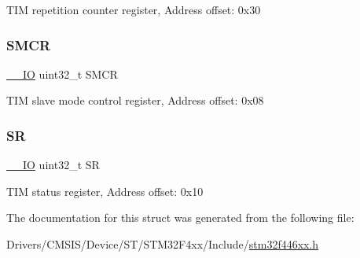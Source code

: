 T\+IM repetition counter register, Address offset\+: 0x30 \mbox{\label{struct_t_i_m___type_def_a2870732a4fc2ecd7bbecfbcbbf5528b7}} 
\subsubsection{\texorpdfstring{S\+M\+CR}{SMCR}}
{\footnotesize\ttfamily \mbox{\hyperlink{core__sc300_8h_aec43007d9998a0a0e01faede4133d6be}{\+\_\+\+\_\+\+IO}} uint32\+\_\+t S\+M\+CR}

T\+IM slave mode control register, Address offset\+: 0x08 \mbox{\label{struct_t_i_m___type_def_af6aca2bbd40c0fb6df7c3aebe224a360}} 
\subsubsection{\texorpdfstring{SR}{SR}}
{\footnotesize\ttfamily \mbox{\hyperlink{core__sc300_8h_aec43007d9998a0a0e01faede4133d6be}{\+\_\+\+\_\+\+IO}} uint32\+\_\+t SR}

T\+IM status register, Address offset\+: 0x10 

The documentation for this struct was generated from the following file\+:\begin{DoxyCompactItemize}
\item 
Drivers/\+C\+M\+S\+I\+S/\+Device/\+S\+T/\+S\+T\+M32\+F4xx/\+Include/\mbox{\hyperlink{stm32f446xx_8h}{stm32f446xx.\+h}}\end{DoxyCompactItemize}
